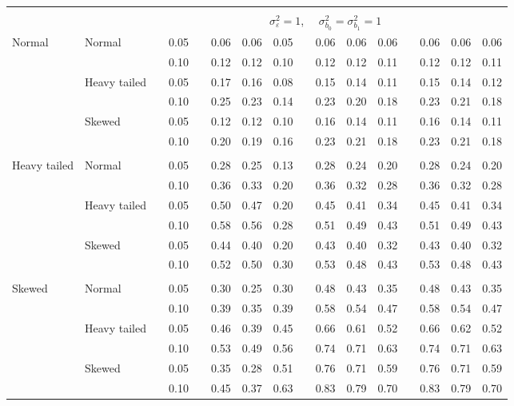\begin{table}[ht]
\begin{scriptsize}
\begin{tabular}{ll p{.1cm} c p{.1cm} rrr p{.1cm} rrr p{.1cm} rrr}
&&&&&&&&&&&&&&&\\
& && && \multicolumn{9}{c}{$\sigma_{\varepsilon}^2 = 1$, \ \ $\sigma_{b_0}^2 = \sigma_{b_1}^2 = 1$} \\ \cline{6-16}

\rowcolor{gray!20}Normal       & Normal       && 0.05 &&  0.06 & 0.06 & 0.05 && 0.06 & 0.06 & 0.06 && 0.06 & 0.06 & 0.06 \\ 
\rowcolor{gray!20}             &              && 0.10 &&  0.12 & 0.12 & 0.10 && 0.12 & 0.12 & 0.11 && 0.12 & 0.12 & 0.11 \\ 
\rowcolor{gray!20}             & Heavy tailed && 0.05 &&  0.17 & 0.16 & 0.08 && 0.15 & 0.14 & 0.11 && 0.15 & 0.14 & 0.12 \\ 
\rowcolor{gray!20}             &              && 0.10 &&  0.25 & 0.23 & 0.14 && 0.23 & 0.20 & 0.18 && 0.23 & 0.21 & 0.18 \\ 
\rowcolor{gray!20}             & Skewed       && 0.05 &&  0.12 & 0.12 & 0.10 && 0.16 & 0.14 & 0.11 && 0.16 & 0.14 & 0.11 \\ 
\rowcolor{gray!20}             &              && 0.10 &&  0.20 & 0.19 & 0.16 && 0.23 & 0.21 & 0.18 && 0.23 & 0.21 & 0.18 \\ 
             &&&&&&&&&&&&&&&\\
Heavy tailed & Normal       && 0.05 &&  0.28 & 0.25 & 0.13 && 0.28 & 0.24 & 0.20 && 0.28 & 0.24 & 0.20 \\ 
             &              && 0.10 &&  0.36 & 0.33 & 0.20 && 0.36 & 0.32 & 0.28 && 0.36 & 0.32 & 0.28 \\ 
             & Heavy tailed && 0.05 &&  0.50 & 0.47 & 0.20 && 0.45 & 0.41 & 0.34 && 0.45 & 0.41 & 0.34 \\ 
             &              && 0.10 &&  0.58 & 0.56 & 0.28 && 0.51 & 0.49 & 0.43 && 0.51 & 0.49 & 0.43 \\ 
             & Skewed       && 0.05 &&  0.44 & 0.40 & 0.20 && 0.43 & 0.40 & 0.32 && 0.43 & 0.40 & 0.32 \\ 
             &              && 0.10 &&  0.52 & 0.50 & 0.30 && 0.53 & 0.48 & 0.43 && 0.53 & 0.48 & 0.43 \\
             &&&&&&&&&&&&&&&\\ 
Skewed       & Normal       && 0.05 &&  0.30 & 0.25 & 0.30 && 0.48 & 0.43 & 0.35 && 0.48 & 0.43 & 0.35 \\ 
             &              && 0.10 &&  0.39 & 0.35 & 0.39 && 0.58 & 0.54 & 0.47 && 0.58 & 0.54 & 0.47 \\ 
             & Heavy tailed && 0.05 &&  0.46 & 0.39 & 0.45 && 0.66 & 0.61 & 0.52 && 0.66 & 0.62 & 0.52 \\ 
             &              && 0.10 &&  0.53 & 0.49 & 0.56 && 0.74 & 0.71 & 0.63 && 0.74 & 0.71 & 0.63 \\ 
             & Skewed       && 0.05 &&  0.35 & 0.28 & 0.51 && 0.76 & 0.71 & 0.59 && 0.76 & 0.71 & 0.59 \\ 
             &              && 0.10 &&  0.45 & 0.37 & 0.63 && 0.83 & 0.79 & 0.70 && 0.83 & 0.79 & 0.70 \\ 



\end{tabular}
\end{scriptsize}
\end{table}

